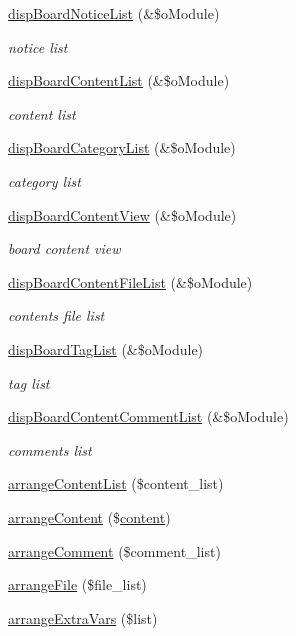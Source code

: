 \begin{DoxyCompactItemize}
\item 
\hyperlink{classboardAPI_a18395a2be76383d74317c1fcc1fb5830}{disp\+Board\+Notice\+List} (\&\$o\+Module)
\begin{DoxyCompactList}\small\item\em notice list \end{DoxyCompactList}\item 
\hyperlink{classboardAPI_a7002a8159c34d85b969647c04f3baaa3}{disp\+Board\+Content\+List} (\&\$o\+Module)
\begin{DoxyCompactList}\small\item\em content list \end{DoxyCompactList}\item 
\hyperlink{classboardAPI_aa527b1afc48bacd728b5d95e969a60f6}{disp\+Board\+Category\+List} (\&\$o\+Module)
\begin{DoxyCompactList}\small\item\em category list \end{DoxyCompactList}\item 
\hyperlink{classboardAPI_aeaa451d5556251f9d148350b34d0481a}{disp\+Board\+Content\+View} (\&\$o\+Module)
\begin{DoxyCompactList}\small\item\em board content view \end{DoxyCompactList}\item 
\hyperlink{classboardAPI_a38441526c56c77613bb6681cf5c927d5}{disp\+Board\+Content\+File\+List} (\&\$o\+Module)
\begin{DoxyCompactList}\small\item\em contents file list \end{DoxyCompactList}\item 
\hyperlink{classboardAPI_af31d812495ea03d7a81c836463a56cad}{disp\+Board\+Tag\+List} (\&\$o\+Module)
\begin{DoxyCompactList}\small\item\em tag list \end{DoxyCompactList}\item 
\hyperlink{classboardAPI_af5b1506259e5aaec1b6f743ac6548203}{disp\+Board\+Content\+Comment\+List} (\&\$o\+Module)
\begin{DoxyCompactList}\small\item\em comments list \end{DoxyCompactList}\item 
\hyperlink{classboardAPI_ade487a5bde6abbc987dbe44f8adf8c22}{arrange\+Content\+List} (\$content\+\_\+list)
\item 
\hyperlink{classboardAPI_a8c3e9522bfba03480917fd7485de99c9}{arrange\+Content} (\$\hyperlink{classcontent}{content})
\item 
\hyperlink{classboardAPI_abf7fe7b5aef6dc0eb6d99cfb96eb5ad1}{arrange\+Comment} (\$comment\+\_\+list)
\item 
\hyperlink{classboardAPI_a01e0faec8a6509f75271f226c9be5004}{arrange\+File} (\$file\+\_\+list)
\item 
\hyperlink{classboardAPI_a80b7a5fb897ce7a42ff20c05f36b6522}{arrange\+Extra\+Vars} (\$list)
\end{DoxyCompactItemize}
